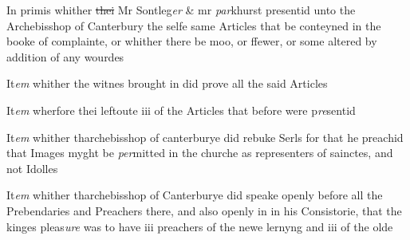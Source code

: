 \documentclass[12pt, a4paper]{book}
\begin{document}
            		
				\marginpar[\vspace{0.5cm}{\textcolor{Gray}{1}}]{}
			
		\ifthenelse{\isodd{\thepage}}
		{\reversemarginpar}
		{\normalmarginpar}
		In primis whither \sout{thei }
            			Mr Sontleg\textit{er} \& mr \textit{par}khurst
			 presentid unto the Archebisshop of Canterbury the selfe same Articles that be conteyned in the booke of complainte, or whither there be moo, or ffewer, or some altered by addition of any wourdes
            		
            			
				\marginpar[\vspace{0.5cm}{\textcolor{Gray}{2}}]{}
			
            			
		\ifthenelse{\isodd{\thepage}}
		{\reversemarginpar}
		{\normalmarginpar}
		It\textit{em} whither the witnes brought in did prove all the said Articles
            		
            				
				\marginpar[\vspace{0.5cm}{\textcolor{Gray}{3}}]{}
			
            				
		\ifthenelse{\isodd{\thepage}}
		{\reversemarginpar}
		{\normalmarginpar}
		It\textit{em} wherfore thei leftoute iii of the Articles that before were p\textit{re}sentid
            		
            		
            			
				\marginpar[\vspace{0.5cm}{\textcolor{Gray}{4}}]{}
			
            			
		\ifthenelse{\isodd{\thepage}}
		{\reversemarginpar}
		{\normalmarginpar}
		It\textit{em} whither tharchebisshop of canterburye did rebuke Serls for that he preachid that Images myght be \textit{per}mitted in the churche as representers of sainctes, and not Idolles
            		
            		
            			
				\marginpar[\vspace{0.5cm}{\textcolor{Gray}{5}}]{}
			
            			
		\ifthenelse{\isodd{\thepage}}
		{\reversemarginpar}
		{\normalmarginpar}
		It\textit{em} whither tharchebisshop of Canterburye did speake openly before all the Prebendaries and Preachers there, and also openly in in his Consistorie, that the kinges pleas\textit{ure} was to have iii preachers of the newe lernyng and iii of the olde 
            		
\end{document}
